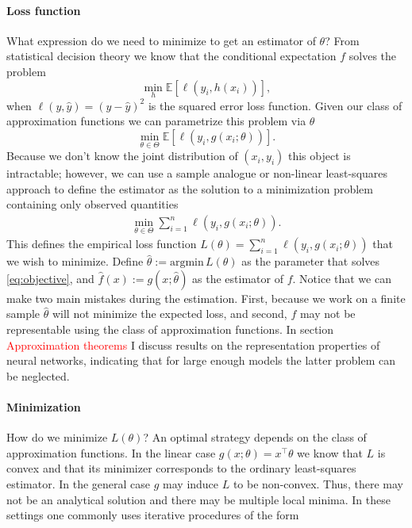 \paragraph{Loss function}

What expression do we need to minimize to get an estimator of $\theta$? From statistical
decision theory we know that the conditional expectation $f$ solves the problem
\[
    \min_h \mathbb{E}\left[\ell\left(y_i, h(x_i)\right) \right],
\]
when $\ell(y, \hat{y}) = (y - \hat{y})^2$ is the squared error loss function. Given our
class of approximation functions we can parametrize this problem via $\theta$
\[
    \min_{\theta \in \Theta} \mathbb{E}\left[\ell\left(y_i, g(x_i; \theta)\right) \right].
\]
Because we don't know the joint distribution of $(x_i, y_i)$ this object is intractable;
however, we can use a sample analogue or non-linear least-squares approach to define
the estimator as the solution to a minimization problem containing only observed
quantities
\begin{align}
    \min_{\theta \in \Theta} \sum_{i = 1}^n \ell\left(y_i, g(x_i; \theta)\right).
    \tag{MP}
    \label{eq:objective}
\end{align}
This defines the empirical loss function $L(\theta) = \sum_{i = 1}^n \ell\left(y_i,
g(x_i; \theta)\right)$ that we wish to minimize. Define $\hat{\theta} := \text{argmin}
\, L(\theta)$ as the parameter that solves \ref{eq:objective}, and $\hat{f}(x) := g(x;
\hat{\theta})$ as the estimator of $f$. Notice that we can make two main mistakes during
the estimation. First, because we work on a finite sample $\hat{\theta}$ will not
minimize the expected loss, and second, $f$ may not be representable using the class of
approximation functions. In section \textcolor{red}{Approximation theorems} I discuss
results on the representation properties of neural networks, indicating that for large
enough models the latter problem can be neglected.

\paragraph{Minimization}

How do we minimize $L(\theta)$? An optimal strategy depends on the class of
approximation functions. In the linear case $g(x; \theta) = x^\top \theta$ we know that
$L$ is convex and that its minimizer corresponds to the ordinary least-squares
estimator. In the general case $g$ may induce $L$ to be non-convex. Thus, there may not
be an analytical solution and there may be multiple local minima. In these settings one
commonly uses iterative procedures of the form

